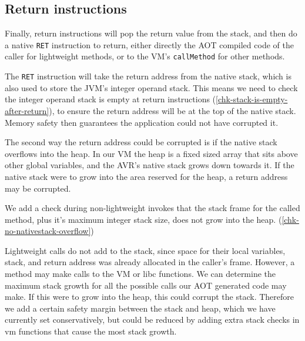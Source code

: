 \subsection{Return instructions}
Finally, return instructions will pop the return value from the stack, and then do a native \texttt{RET} instruction to return, either directly the AOT compiled code of the caller for lightweight methods, or to the VM's \texttt{callMethod} for other methods.

The \texttt{RET} instruction will take the return address from the native stack, which is also used to store the JVM's integer operand stack. This means we need to check the integer operand stack is empty at return instructions (\ref{chk-stack-is-empty-after-return}), to ensure the return address will be at the top of the native stack. Memory safety then guarantees the application could not have corrupted it.

The second way the return address could be corrupted is if the native stack overflows into the heap. In our VM the heap is a fixed sized array that sits above other global variables, and the AVR's native stack grows down towards it. If the native stack were to grow into the area reserved for the heap, a return address may be corrupted.

We add a check during non-lightweight invokes that the stack frame for the called method, plus it's maximum integer stack size, does not grow into the heap. (\ref{chk-no-nativestack-overflow})

Lightweight calls do not add to the stack, since space for their local variables, stack, and return address was already allocated in the caller's frame. However, a method may make calls to the VM or libc functions. We can determine the maximum stack growth for all the possible calls our AOT generated code may make. If this were to grow into the heap, this could corrupt the stack. Therefore we add a certain safety margin between the stack and heap, which we have currently set conservatively, but could be reduced by adding extra stack checks in vm functions that cause the most stack growth.

